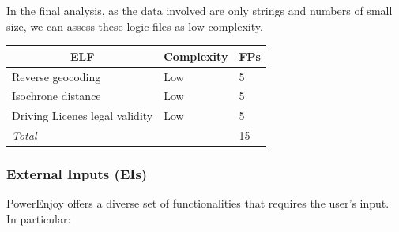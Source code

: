 \documentclass[english]{article}
\begin{document}
In the final analysis, as the data involved are only strings and numbers of small size, we can assess these logic files as low complexity.\\

\begin{center}
	\begin{tabular}{ |p{8cm}|m{2cm}|p{1cm}| }
		\hline
		\multicolumn{1}{|c|}{\textbf{ELF}} & \multicolumn{1}{c|}{\textbf{Complexity}} & \multicolumn{1}{c|}{\textbf{FPs}} \\
		\hline
		Reverse geocoding & Low & 5 \\
		\hline
		Isochrone distance & Low & 5\\
		\hline
		Driving Licenes legal validity & Low & 5\\
		\hline
		\multicolumn{2}{|l|}{\textit{Total}} & \multicolumn{1}{l|}{15} \\
		\hline
	\end{tabular}
\end{center}

\paragraph{}
\subsubsection{External Inputs (EIs)}

PowerEnjoy offers a diverse set of functionalities that requires the user's input.\\
In particular:
\end{document}
